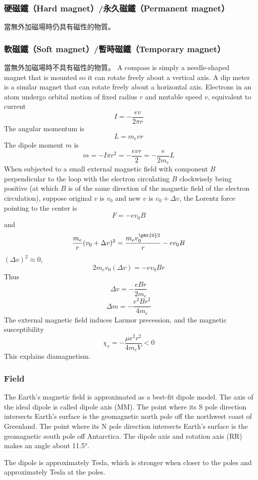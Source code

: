 \documentclass[a4paper,12pt]{report}
\begin{document}
\begin{itemize}
\subsubsection{硬磁鐵（Hard magnet）/永久磁鐵（Permanent magnet）}
當無外加磁場時仍具有磁性的物質。
\subsubsection{軟磁鐵（Soft magnet）/暫時磁鐵（Temporary magnet）}
當無外加磁場時不具有磁性的物質。
A compass is simply a needle-shaped magnet that is mounted so it can rotate freely about a vertical axis.
A dip meter is a similar magnet that can rotate freely about a horizontal axis.
Electrons in an atom undergo orbital motion of fixed radius $r$ and mutable speed $v$, equivalent to current
\[I=-\frac{ev}{2\pi r}\]
The angular momentum is
\[L=m_evr\]
The dipole moment $m$ is
\[m=-I\pi r^2=-\frac{evr}{2}=-\frac{e}{2m_e}L\]
When subjected to a small external magnetic field with component $B$ perpendicular to the loop with the electron circulating $B$ clockwisely being positive (at which $B$ is of the same direction of the magnetic field of the electron circulation), suppose original $v$ is $v_0$ and new $v$ is $v_0+\Delta v$, the Lorentz force pointing to the center is
\[F=-ev_0B\]
and
\[\frac{m_e}{r}(v_0+\Delta v)^2=\frac{m_ev_0^{\pht{0}2}}{r}-ev_0B\]
$(\Delta v)^2\approx 0$,
\[2m_ev_0(\Delta v)=-ev_0Br\]
Thus
\[\Delta v=-\frac{eBr}{2m_e}\]
\[\Delta m=-\frac{e^2Br^2}{4m_e}\]
The external magnetic field induces Larmor precession, and the magnetic susceptibility
\[\chi_v=-\frac{\mu e^2r^2}{4m_eV}<0\]
This explains diamagnetism.
\subsubsection{Field}
The Earth's magnetic field is approximated as a best-fit dipole model. The axis of the ideal dipole is called dipole axis (MM). The point where its S pole direction intersects Earth's surface is the geomagnetic north pole off the northwest coast of Greenland. The point where its N pole direction intersects Earth's surface is the geomagnetic south pole off Antarctica. The dipole axis and rotation axis (RR) makes an angle about 11.5°.

The dipole is approximately  Tesla, which is stronger when closer to the poles and approximately  Tesla at the poles.


\end{itemize}
\end{document}
